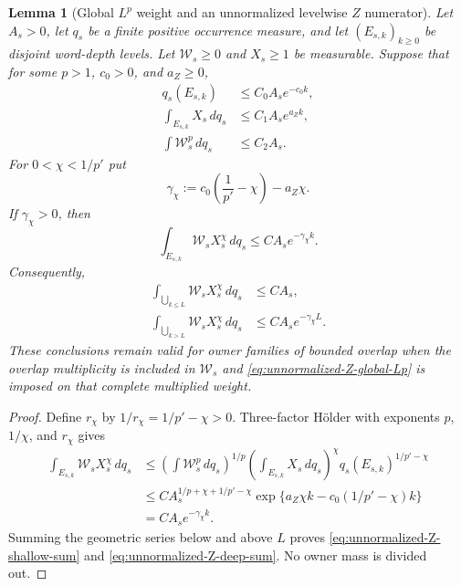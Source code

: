 \documentclass[11pt]{article}
\newtheorem{lemma}[theorem]{Lemma}
\begin{document}
\begin{lemma}[Global $L^p$ weight and an unnormalized levelwise
$Z$ numerator]
\label{lem:global-Lp-unnormalized-levelwise-Z}
Let $A_s>0$, let $q_s$ be a finite positive occurrence measure, and let
$(E_{s,k})_{k\ge0}$ be disjoint word-depth levels.  Let
$\mathcal W_s\ge0$ and $X_s\ge1$ be measurable.  Suppose that for some
$p>1$, $c_0>0$, and $a_Z\ge0$,
\begin{align}
 q_s(E_{s,k})
 &\le C_0A_s e^{-c_0k},
 \label{eq:unnormalized-Z-level-mass}\\
 \int_{E_{s,k}}X_s\,dq_s
 &\le C_1A_s e^{a_Zk},
 \label{eq:unnormalized-Z-level-numerator}\\
 \int \mathcal W_s^p\,dq_s
 &\le C_2A_s.
 \label{eq:unnormalized-Z-global-Lp}
\end{align}
For $0<\chi<1/p'$ put
\begin{equation}
\label{eq:unnormalized-Z-derived-rate}
 \gamma_\chi
 :=c_0\left(\frac1{p'}-\chi\right)-a_Z\chi .
\end{equation}
If $\gamma_\chi>0$, then
\begin{equation}
\label{eq:unnormalized-Z-marked-level}
 \int_{E_{s,k}}\mathcal W_sX_s^\chi\,dq_s
 \le C A_s e^{-\gamma_\chi k}.
\end{equation}
Consequently,
\begin{align}
 \int_{\bigcup_{k\le L}}\mathcal W_sX_s^\chi\,dq_s
 &\le CA_s,
 \label{eq:unnormalized-Z-shallow-sum}\\
 \int_{\bigcup_{k>L}}\mathcal W_sX_s^\chi\,dq_s
 &\le CA_s e^{-\gamma_\chi L}.
 \label{eq:unnormalized-Z-deep-sum}
\end{align}
These conclusions remain valid for owner families of bounded overlap when
the overlap multiplicity is included in $\mathcal W_s$ and
\eqref{eq:unnormalized-Z-global-Lp} is imposed on that complete multiplied
weight.
\end{lemma}

\begin{proof}
Define $r_\chi$ by
$1/r_\chi=1/p'-\chi>0$.  Three-factor H\"older with exponents
$p$, $1/\chi$, and $r_\chi$ gives
\begin{align*}
 \int_{E_{s,k}}\mathcal W_sX_s^\chi\,dq_s
 &\le
 \left(\int\mathcal W_s^p\,dq_s\right)^{1/p}
 \left(\int_{E_{s,k}}X_s\,dq_s\right)^\chi
 q_s(E_{s,k})^{1/p'-\chi}\\
 &\le
 C A_s^{1/p+\chi+1/p'-\chi}
 \exp\{a_Z\chi k-c_0(1/p'-\chi)k\}\\
 &=CA_s e^{-\gamma_\chi k}.
\end{align*}
Summing the geometric series below and above $L$ proves
\eqref{eq:unnormalized-Z-shallow-sum} and
\eqref{eq:unnormalized-Z-deep-sum}.  No owner mass is divided out.
\end{proof}
\end{document}
